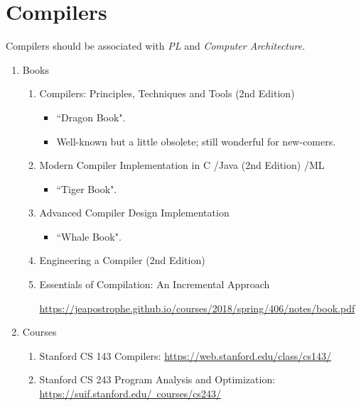 \documentclass{article}
\begin{document}
\section{Compilers}
Compilers should be associated with \emph{PL} and \emph{Computer Architecture}.
\begin{enumerate}
    \item Books
    \begin{enumerate}
        \item Compilers: Principles, Techniques and Tools (2nd Edition) \cite{aho2007compilers}
        \begin{itemize}
            \item ``Dragon Book".
            \item Well-known but a little obsolete; still wonderful for new-comers.
        \end{itemize}
        \item Modern Compiler Implementation in C \cite{appel2004modern}/Java (2nd Edition) \cite{appel2003modern}/ML \cite{appel1998modern}
        \begin{itemize}
            \item ``Tiger Book".
        \end{itemize}
        \item Advanced Compiler Design Implementation \cite{muchnick1997advanced}
        \begin{itemize}
            \item ``Whale Book".
        \end{itemize}
        \item Engineering a Compiler (2nd Edition) \cite{cooper2011engineering}    \item Essentials of Compilation: An Incremental Approach

        \href{https://jeapostrophe.github.io/courses/2018/spring/406/notes/book.pdf}{https://jeapostrophe.github.io/courses/2018/spring/406/notes/book.pdf}
        
    \end{enumerate}
    
    \item Courses
    \begin{enumerate}
        \item Stanford CS 143 Compilers:
        \href{https://web.stanford.edu/class/cs143/}{https://web.stanford.edu/class/cs143/}
        \item Stanford CS 243 Program Analysis and Optimization:\\
        \href{https://suif.stanford.edu/~courses/cs243/}{https://suif.stanford.edu/~courses/cs243/}
    \end{enumerate}


\end{enumerate}
\end{document}
